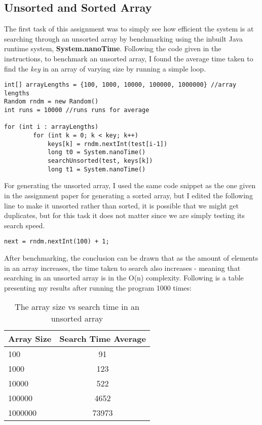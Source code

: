 \documentclass[a4paper,11pt]{article}
\begin{document}
\subsection*{Unsorted and Sorted Array}
The first task of this assignment was to simply see how efficient the system is at searching through an unsorted array by benchmarking using the inbuilt Java runtime system, \textbf{System.nanoTime}. Following the code given in the instructions, to benchmark an unsorted array, I found the average time taken to find the {\em key} in an array of varying size by running a simple loop.
\begin{verbatim}
int[] arrayLengths = {100, 1000, 10000, 100000, 1000000} //array lengths
Random rndm = new Random()
int runs = 10000 //runs runs for average

for (int i : arrayLengths)
        for (int k = 0; k < key; k++)
            keys[k] = rndm.nextInt(test[i-1])
            long t0 = System.nanoTime()
            searchUnsorted(test, keys[k])
            long t1 = System.nanoTime()
\end{verbatim}
For generating the unsorted array, I used the same code snippet as the one given in the assignment paper for generating a sorted array, but I edited the following line to make it unsorted rather than sorted, it is possible that we might get duplicates, but for this task it does not matter since we are simply testing its search speed.
\begin{verbatim}
next = rndm.nextInt(100) + 1;
\end{verbatim}

After benchmarking, the conclusion can be drawn that as the amount of elements in an array increases, the time taken to search also increases - meaning that searching in an unsorted array is in the O(n) complexity. Following is a table presenting my results after running the program 1000 times:

\begin{table}[h]
\begin{center}
\begin{tabular}{l|c}
\textbf{Array Size} & \textbf{Search Time Average}\\
\hline
  100      &  91    \\
  1000     &  123   \\
  10000    &  522   \\
  100000   &  4652  \\
  1000000  &  73973 \\

\end{tabular}
\caption{The array size vs search time in an unsorted array}
\label{tab:table1}
\end{center}
\end{table}
\end{document}
